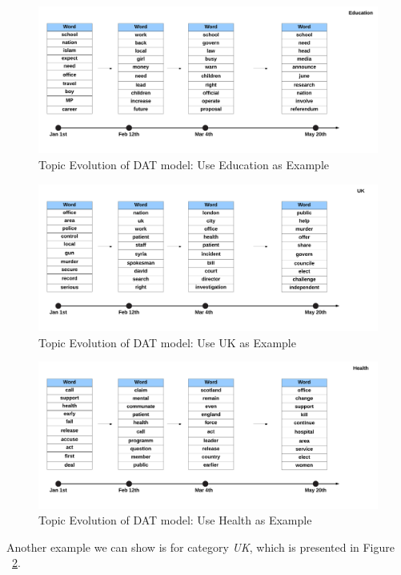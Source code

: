 \begin{figure}[h]
\centering
\includegraphics[width=1\textwidth]{figures/dat_education_tc.png}
\caption{Topic Evolution of DAT model: Use Education as Example}
\label{fig:dat_education_tc}
\end{figure}
\begin{figure}[h]
\centering
\includegraphics[width=1\textwidth]{figures/dat_uk_tc.png}
\caption{Topic Evolution of DAT model: Use UK as Example}
\label{fig:dat_uk_tc}
\end{figure}
\begin{figure}[h]
\centering
\includegraphics[width=1\textwidth]{figures/dat_health_tc.png}
\caption{Topic Evolution of DAT model: Use Health as Example}
\label{fig:dat_health_tc}
\end{figure}

Another example we can show is for category \textit{UK}, which is presented in Figure ~\ref{fig:dat_uk_tc}.

